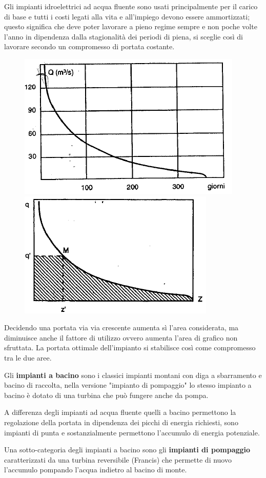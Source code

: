 \documentclass[a4paper, 15pt]{article}
\begin{document}
\begin{adjustwidth}{2in}{}
	Gli impianti idroelettrici ad acqua fluente sono usati principalmente per il carico di base e tutti i costi legati alla vita e all'impiego devono essere ammortizzati; questo significa che deve poter lavorare a pieno regime sempre e non poche volte l'anno in dipendenza dalla stagionalità dei periodi di piena, si sceglie così di lavorare secondo un compromesso di portata costante. 	
\begin{figure}[H]
	\centering
	\includegraphics[width=0.4\linewidth]{immagini/caputo3}
	\label{fig:caputo3}
	\includegraphics[width=0.4\linewidth]{immagini/caputo4}
	\label{fig:caputo4}	
\end{figure}
	Decidendo una portata via via crescente aumenta sì l'area considerata, ma diminuisce anche il fattore di utilizzo ovvero aumenta l'area di grafico non sfruttata. La portata ottimale dell'impianto si stabilisce così come compromesso tra le due aree. \newline 
	
	Gli \textbf{impianti a bacino} sono i classici impianti montani con diga a sbarramento e bacino di raccolta, nella versione "impianto di pompaggio" lo stesso impianto a bacino è dotato di una turbina che può fungere anche da pompa. \newline 
	
	A differenza degli impianti ad acqua fluente quelli a bacino permettono la regolazione della portata in dipendenza dei picchi di energia richiesti, sono impianti di punta e sostanzialmente permettono l'accumulo di energia potenziale. \newline 
	
	Una sotto-categoria degli impianti a bacino sono gli \textbf{impianti di pompaggio} caratterizzati da una turbina reversibile (Francis) che permette di nuovo l'accumulo pompando l'acqua indietro al bacino di monte. \newline 
	

\end{adjustwidth}
\end{document}
